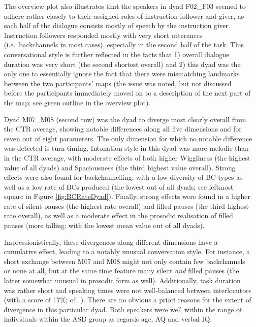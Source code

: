 The overview plot also illustrates that the speakers in dyad F02\_F03 seemed to adhere rather closely to their assigned roles of instruction follower and giver, as each half of the dialogue consists mostly of speech by the instruction giver. Instruction followers responded mostly with very short utterances (i.e.~backchannels in most cases), especially in the second half of the task. This conversational style is further reflected in the facts that 1) overall dialogue duration was very short (the second shortest overall) and 2) this dyad was the only one to essentially ignore the fact that there were mismatching landmarks between the two participants' maps (the issue was noted, but not discussed before the participants immediately moved on to a description of the next part of the map; see green outline in the overview plot).

Dyad M07\_M08 (second row) was the dyad to diverge most clearly overall from the CTR average, showing notable differences along all five dimensions and for seven out of eight parameters. The only dimension for which no notable difference was detected is turn-timing. Intonation style in this dyad was more melodic than in the CTR average, with moderate effects of both higher Wiggliness (the highest value of all dyads) and Spaciousness (the third highest value overall). Strong effects were also found for backchannelling, with a low diversity of BC types as well as a low rate of BCs produced (the lowest out of all dyads; see leftmost square in Figure \ref{fig:BCRateDyad}). Finally, strong effects were found in a higher rate of silent pauses (the highest rate overall) and filled pauses (the third highest rate overall), as well as a moderate effect in the prosodic realisation of filled pauses (more falling; with the lowest mean value out of all dyads).

Impressionistically, these divergences along different dimensions have a cumulative effect, leading to a notably unusual conversation style. For instance, a short exchange between M07 and M08 might not only contain few backchannels or none at all, but at the same time feature many silent \emph{and} filled pauses (the latter somewhat unusual in prosodic form as well). Additionally, task duration was rather short and speaking times were not well-balanced between interlocutors (with a score of 17\%; cf.~). There are no obvious a priori reasons for the extent of divergence in this particular dyad. Both speakers were well within the range of individuals within the ASD group as regards age, AQ and verbal IQ.

